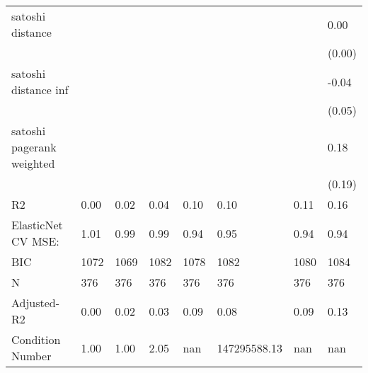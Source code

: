 \begin{table}
\begin{center}
\begin{tabular}{llllllll}
 satoshi distance                           &          &            &         &         &              &                    & 0.00      \\
                                                 &          &            &         &         &              &                    & (0.00)    \\
 satoshi distance inf                       &          &            &         &         &              &                    & -0.04     \\
                                                 &          &            &         &         &              &                    & (0.05)    \\
 satoshi pagerank weighted                  &          &            &         &         &              &                    & 0.18      \\
                                                 &          &            &         &         &              &                    & (0.19)    \\
R2                                               & 0.00     & 0.02       & 0.04    & 0.10    & 0.10         & 0.11               & 0.16      \\
ElasticNet CV MSE:                               & 1.01     & 0.99       & 0.99    & 0.94    & 0.95         & 0.94               & 0.94      \\
BIC                                              & 1072     & 1069       & 1082    & 1078    & 1082         & 1080               & 1084      \\
N                                                & 376      & 376        & 376     & 376     & 376          & 376                & 376       \\
Adjusted-R2                                      & 0.00     & 0.02       & 0.03    & 0.09    & 0.08         & 0.09               & 0.13      \\
Condition Number                                 & 1.00     & 1.00       & 2.05    & nan     & 147295588.13 & nan                & nan       \\
\hline
\end{tabular}
\end{center}
\end{table}